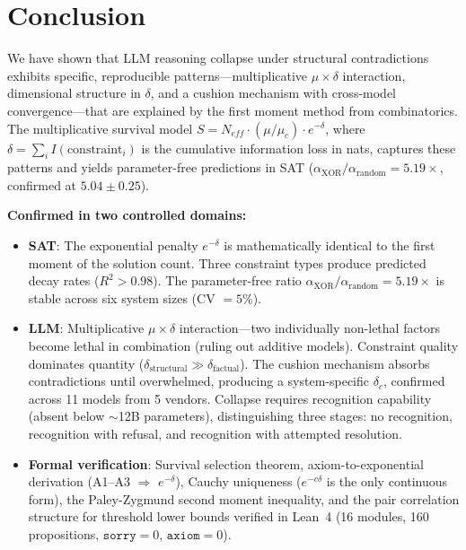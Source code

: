 \documentclass[11pt,a4paper]{article}
\begin{document}
\section{Conclusion}
\label{sec:conclusion}

We have shown that LLM reasoning collapse under structural contradictions exhibits specific, reproducible patterns---multiplicative $\mu \times \delta$ interaction, dimensional structure in $\delta$, and a cushion mechanism with cross-model convergence---that are explained by the first moment method from combinatorics. The multiplicative survival model $S = N_{eff} \cdot (\mu/\mu_c) \cdot e^{-\delta}$, where $\delta = \sum_i I(\text{constraint}_i)$ is the cumulative information loss in nats, captures these patterns and yields parameter-free predictions in SAT ($\alpha_{\text{XOR}}/\alpha_{\text{random}} = 5.19\times$, confirmed at $5.04 \pm 0.25$).

\textbf{Confirmed in two controlled domains:}
\begin{itemize}
    \item \textbf{SAT}: The exponential penalty $e^{-\delta}$ is mathematically identical to the first moment of the solution count. Three constraint types produce predicted decay rates ($R^2 > 0.98$). The parameter-free ratio $\alpha_{\text{XOR}}/\alpha_{\text{random}} = 5.19\times$ is stable across six system sizes (CV $= 5\%$).
    \item \textbf{LLM}: Multiplicative $\mu \times \delta$ interaction---two individually non-lethal factors become lethal in combination (ruling out additive models). Constraint quality dominates quantity ($\delta_{\text{structural}} \gg \delta_{\text{factual}}$). The cushion mechanism absorbs contradictions until overwhelmed, producing a system-specific $\delta_c$, confirmed across 11 models from 5 vendors. Collapse requires recognition capability (absent below $\sim$12B parameters), distinguishing three stages: no recognition, recognition with refusal, and recognition with attempted resolution.
    \item \textbf{Formal verification}: Survival selection theorem, axiom-to-exponential derivation (A1--A3 $\Rightarrow$ $e^{-\delta}$), Cauchy uniqueness ($e^{-c\delta}$ is the only continuous form), the Paley-Zygmund second moment inequality, and the pair correlation structure for threshold lower bounds verified in Lean~4 (16 modules, 160 propositions, $\texttt{sorry} = 0$, $\texttt{axiom} = 0$).
\end{itemize}
\end{document}

